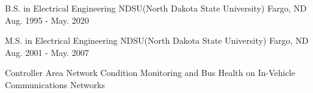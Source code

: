 

\begin{cventries}

  \cventry
    {B.S. in Electrical Engineering} %
    {NDSU(North Dakota State University)} %
    {Fargo, ND} %
    {Aug. 1995 - May. 2020} %
    {
      \begin{cvitems} %
      \end{cvitems}
    }

  \cventry
    {M.S. in Electrical Engineering} %
    {NDSU(North Dakota State University)} %
    {Fargo, ND} %
    {Aug. 2001 - May. 2007} %
    {
      \begin{cvitems} %
        \item {Controller Area Network Condition Monitoring and Bus Health on In-Vehicle Communications Networks}
      \end{cvitems}
    }


\end{cventries}
